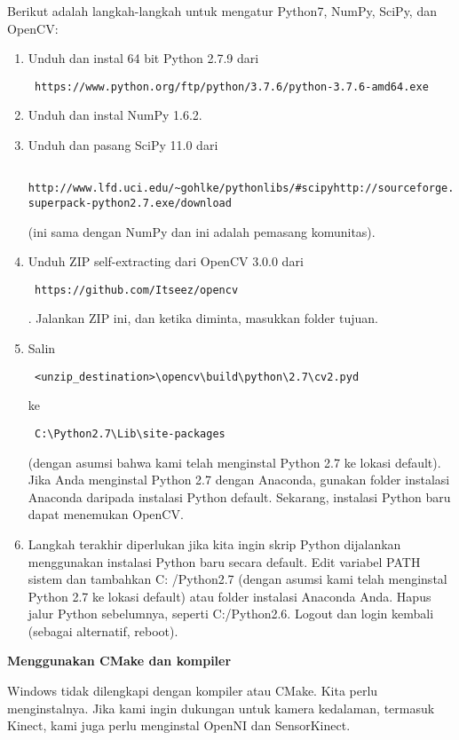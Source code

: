 Berikut adalah langkah-langkah untuk mengatur Python7, NumPy, SciPy, dan OpenCV:
\begin{enumerate}
	\item Unduh dan instal 64 bit Python 2.7.9 dari \begin{verbatim} https://www.python.org/ftp/python/3.7.6/python-3.7.6-amd64.exe \end{verbatim}
	\item Unduh dan instal NumPy 1.6.2.
	\item Unduh dan pasang SciPy 11.0 dari \begin{verbatim} http://www.lfd.uci.edu/~gohlke/pythonlibs/#scipyhttp://sourceforge.net/projects/scipy/files/scipy/0.11.0/scipy0.11.0win32-superpack-python2.7.exe/download \end{verbatim} (ini sama dengan NumPy dan ini adalah pemasang komunitas).
	\item Unduh ZIP self-extracting dari OpenCV 3.0.0 dari \begin{verbatim} https://github.com/Itseez/opencv \end{verbatim}. Jalankan ZIP ini, dan ketika diminta, masukkan folder tujuan. 
	\item Salin \begin{verbatim} <unzip_destination>\opencv\build\python\2.7\cv2.pyd \end{verbatim} ke \begin{verbatim} C:\Python2.7\Lib\site-packages \end{verbatim} (dengan asumsi bahwa kami telah menginstal Python 2.7 ke lokasi default). Jika Anda menginstal Python 2.7 dengan Anaconda, gunakan folder instalasi Anaconda daripada instalasi Python default. Sekarang, instalasi Python baru dapat menemukan OpenCV.
	\item Langkah terakhir diperlukan jika kita ingin skrip Python dijalankan menggunakan instalasi Python baru secara default. Edit variabel PATH sistem dan tambahkan C: /Python2.7 (dengan asumsi kami telah menginstal Python 2.7 ke lokasi default) atau folder instalasi Anaconda Anda. Hapus jalur Python sebelumnya, seperti C:/Python2.6. Logout dan login kembali (sebagai alternatif, reboot).
\end{enumerate}

\newpage
\textbf{Menggunakan CMake dan kompiler}

Windows tidak dilengkapi dengan kompiler atau CMake. Kita perlu menginstalnya. Jika kami ingin dukungan untuk kamera kedalaman, termasuk Kinect, kami juga perlu menginstal OpenNI dan SensorKinect.

